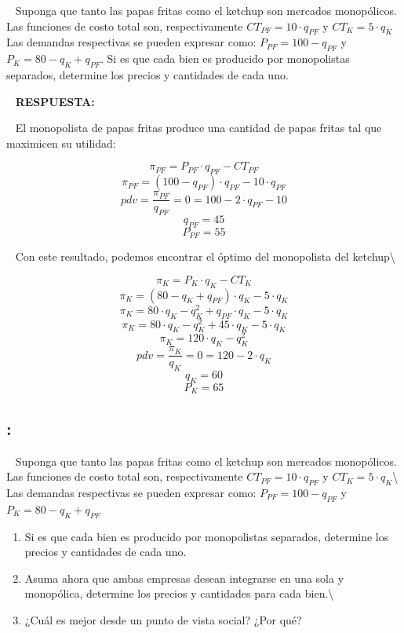 \documentclass[
  letterpaper,
  DIV=11,
  numbers=noendperiod]{scrreport}
\begin{document}
~ Suponga que tanto las papas fritas como el ketchup son mercados
monopólicos. Las funciones de costo total son, respectivamente
\(CT_{PF}=10\cdot q_{PF}\) y \(CT_{K}=5\cdot q_{K}\) ~ Las demandas
respectivas se pueden expresar como: \(P_{PF}=100 - q_{PF}\) y
\(P_{K}= 80 - q_{K} + q_{PF}\). Si es que cada bien es producido por
monopolistas separados, determine los precios y cantidades de cada uno.

~ \textbf{RESPUESTA:}

~ El monopolista de papas fritas produce una cantidad de papas fritas
tal que maximicen su utilidad:

\[\pi_{PF}= P_{PF}\cdot q_{PF} - CT_{PF}\]
\[\pi_{PF}= (100 - q_{PF})\cdot q_{PF} - 10\cdot q_{PF}\]
\[ pdv = \frac{\pi_{PF}}{q_{PF}}=0= 100-2\cdot q_{PF} - 10\]
\[q_{PF} = 45\] \[P_{PF} = 55\]

~ Con este resultado, podemos encontrar el óptimo del monopolista del
ketchup\textbackslash{}

\[\pi_{K}= P_{K}\cdot q_{K} - CT_{K}\]
\[\pi_{K}= (80 - q_{K} + q_{PF} )\cdot q_{K} - 5\cdot q_{K}\]
\[\pi_{K}= 80\cdot q_{K} - q_{K}^2 + q_{PF}\cdot q_{K} - 5\cdot q_{K}\]
\[\pi_{K}= 80\cdot q_{K} - q_{K}^2 + 45\cdot q_{K}  - 5\cdot q_{K}\]
\[\pi_{K}= 120\cdot q_{K} - q_{K}^2\]
\[pdv = \frac{\pi_{K}}{q_{K}}=0= 120-2\cdot q_{K}\] \[q_{K} = 60\]
\[P_{K} = 65\]

\hypertarget{section-26}{%
\subsection{:}\label{section-26}}

~ Suponga que tanto las papas fritas como el ketchup son mercados
monopólicos. Las funciones de costo total son, respectivamente
\(CT_{PF}=10\cdot q_{PF}\) y \(CT_{K}=5\cdot q_{K}\)\textbackslash{} Las
demandas respectivas se pueden expresar como: \(P_{PF}=100 - q_{PF}\) y
\(P_{K}= 80 - q_{K} + q_{PF}\)

\begin{enumerate}
\def\labelenumi{\alph{enumi})}
\item
  Si es que cada bien es producido por monopolistas separados, determine
  los precios y cantidades de cada uno.
\item
  Asuma ahora que ambas empresas desean integrarse en una sola y
  monopólica, determine los precios y cantidades para cada
  bien.\textbackslash{}
\item
  ¿Cuál es mejor desde un punto de vista social? ¿Por qué?
\end{enumerate}
\end{document}
